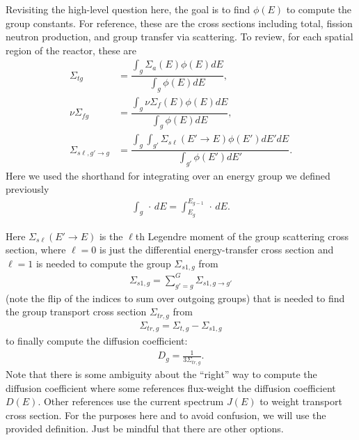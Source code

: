 Revisiting the high-level question here, the goal is to find $\phi(E)$ to compute the group constants. For reference, these are the cross sections including total, fission neutron production, and group transfer via scattering. To review, for each spatial region of the reactor, these are
\begin{subequations}
\begin{align}
  \Sigma_{tg} 
  &= \dfrac{ \displaystyle\int_g \Sigma_a(E) \phi(E) dE }{ \displaystyle\int_g \phi(E) dE }, \\
  \nu\Sigma_{fg} &= 
  \dfrac{ \displaystyle\int_g \nu \Sigma_f(E) \phi(E) dE }{ \displaystyle\int_g \phi(E) dE }, \\  
  \Sigma_{s\ell,g' \rightarrow g} &= 
  \dfrac{ \displaystyle\int_g \displaystyle\int_{g'} \Sigma_{s\ell}(E' \rightarrow E) \phi(E') dE' dE }{ \displaystyle\int_{g'}  \phi(E') dE' }.
\end{align}
\end{subequations}
Here we used the shorthand for integrating over an energy group we defined previously
\begin{align}
  \int_g \, \cdot \, dE = \int_{E_g}^{E_{g-1}} \, \cdot \, dE .
\end{align}

Here $\Sigma_{s\ell}(E' \rightarrow E )$ is the $\ell$th Legendre moment of the group scattering cross section, where $\ell = 0$ is just the differential energy-transfer cross section and $\ell = 1$ is needed to compute the group $\Sigma_{s1,g}$ from
\begin{align}
  \Sigma_{s1,g} = \sum_{g' = g}^G \Sigma_{s1,g \rightarrow g'}
\end{align}
(note the flip of the indices to sum over outgoing groups) that is needed to find the group transport cross section $\Sigma_{tr,g}$ from
\begin{align}
  \Sigma_{tr,g} = \Sigma_{t,g} - \Sigma_{s1,g} 
\end{align}
to finally compute the diffusion coefficient:
\begin{align}
  D_g = \frac{1}{3 \Sigma_{tr,g} } .
\end{align}
Note that there is some ambiguity about the ``right'' way to compute the diffusion coefficient where some references flux-weight the diffusion coefficient $D(E)$. Other references use the current spectrum $J(E)$ to weight transport cross section. For the purposes here and to avoid confusion, we will use the provided definition. Just be mindful that there are other options.

